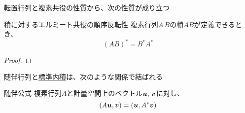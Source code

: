 \documentclass[../../../topic_linear-algebra]{subfiles}
\begin{document}
\sectionline

転置行列と複素共役の性質から、次の性質が成り立つ

\begin{theorem}{積に対するエルミート共役の順序反転性}\label{thm:adjoint-of-product}
  複素行列$A\,B$の積$AB$が定義できるとき、
  \begin{equation*}
    (AB)^* = B^* A^*
  \end{equation*}
\end{theorem}

\begin{proof}
  \todo{}
\end{proof}

\sectionline

随伴行列と\hyperref[def:standard-inner-product-Cn]{標準内積}は、次のような関係で結ばれる

\begin{theorem}{随伴公式}\label{thm:adjoint-identity}
  複素行列$A$と計量空間上のベクトル$\vb*{u},\,\vb*{v}$に対し、
  \begin{equation*}
    (A\vb*{u}, \vb*{v}) = (\vb*{u}, A^*\vb*{v})
  \end{equation*}
\end{theorem}
\end{document}
